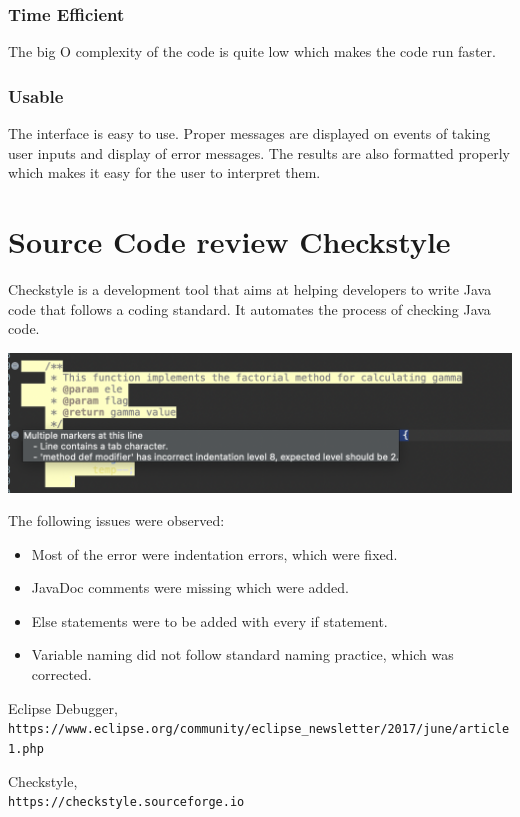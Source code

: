 \documentclass[12pt]{report}
\begin{document}
\subsubsection{Time Efficient}
The big O complexity of the code is quite low which makes the code run faster.
\subsubsection{Usable}
The interface is easy to use. Proper messages are displayed on events of taking user inputs and display of error messages. The results are also formatted properly which makes it easy for the user to interpret them.

\section{Source Code review Checkstyle}
Checkstyle is a development tool that aims at helping developers to write Java code that follows a coding standard. It automates the process of checking Java code. 
\begin{center}
   \includegraphics[scale=0.50]{images/checkstyle.png}
\end{center}
The following issues were observed:
\begin{itemize}
\item Most of the error were indentation errors, which were fixed.
\item JavaDoc comments were missing which were added.
\item Else statements were to be added with every if statement.
\item Variable naming did not follow standard naming practice, which was corrected.
\end{itemize}

\newpage
\begin{thebibliography}{9}

Eclipse Debugger,
\\\texttt{https://www.eclipse.org/community/eclipse_newsletter/2017/june/article1.php}

Checkstyle,
\\\texttt{https://checkstyle.sourceforge.io}


\end{thebibliography}
\end{document}
